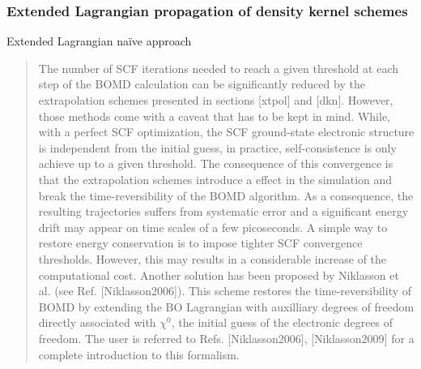 \documentclass[letterpaper,10pt,english]{sphinxmanual}
\begin{document}
\subsubsection{Extended Lagrangian propagation of density kernel schemes}
\label{\detokenize{BOMD:extended-lagrangian-propagation-of-density-kernel-schemes}}
Extended Lagrangian naïve approach
\begin{quote}

\begin{DUlineblock}{0em}
\item[] The number of SCF iterations needed to reach a given threshold at
each step of the BOMD calculation can be significantly reduced by
the extrapolation schemes presented in sections {[}xtpol{]} and {[}dkn{]}.
However, those methods come with a caveat that has to be kept in
mind. While, with a perfect SCF optimization, the SCF ground-state
electronic structure is independent from the initial guess, in
practice, self-consistence is only achieve up to a given
threshold. The consequence of this  convergence is
that the extrapolation schemes introduce a  effect in the
simulation and break the time-reversibility of the BOMD algorithm.
As a consequence, the resulting trajectories suffers from
systematic error and a significant energy drift may appear on time
scales of a few picoseconds. A simple way to restore energy
conservation is to impose tighter SCF convergence thresholds.
However, this may results in a considerable increase of the
computational cost. Another solution has been proposed by
Niklasson et al. (see Ref. {[}Niklasson2006{]}). This
scheme restores the time-reversibility of BOMD by extending the BO
Lagrangian with auxilliary degrees of freedom directly associated
with \(\chi^0\), the initial guess of the electronic degrees
of freedom. The user is referred to
Refs. {[}Niklasson2006{]}, {[}Niklasson2009{]} for a complete
introduction to this formalism.
\end{DUlineblock}
\end{quote}
\end{document}
